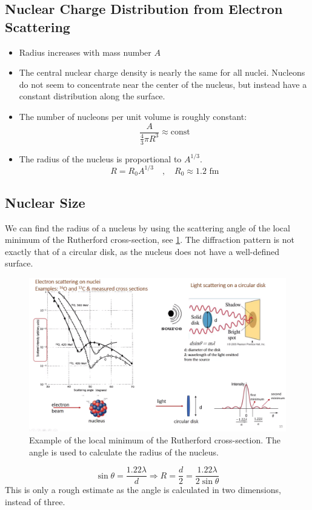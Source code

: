 \subsection{Nuclear Charge Distribution from Electron Scattering}\label{subsec: Nuclear Charge Distribution from Electron Scattering}
\begin{itemize}
    \item Radius increases with mass number $A$
    \item The central nuclear charge density is nearly the same for all nuclei. Nucleons do not seem to concentrate near the center of the nucleus, but instead have a constant distribution along the surface. 
    \item The number of nucleons per unit volume is roughly constant:
    \begin{equation}
    \frac{A}{\frac{4}{3}πR^3} ≈ \text{const}
    \end{equation} 
    \item The radius of the nucleus is proportional to $A^{1/3}$. 
    \begin{equation}
    R = R_0A^{1/3} \quad , \quad  R_0 ≈ 1.2 \text{ fm}
    \end{equation}
\end{itemize}

\subsection{Nuclear Size}
We can find the radius of a nucleus by using the scattering angle of the local minimum of the Rutherford cross-section, see \cref{fig: electron_scattering_angles}. The diffraction pattern is not exactly that of a circular disk, as the nucleus does not have a well-defined surface.
\begin{figure}[ht!]
\centering
\includegraphics[width = \textwidth]{electron_scattering_angles.png}
\caption{Example of the local minimum of the Rutherford cross-section. The angle is used to calculate the radius of the nucleus.}
\label{fig: electron_scattering_angles}
\end{figure}
\begin{equation}
\sin θ = \frac{1.22λ}{d} ⇒ R = \frac{d}{2} = \frac{1.22λ}{2\sin θ}
\end{equation}
This is only a rough estimate as the angle is calculated in two dimensions, instead of three. 



